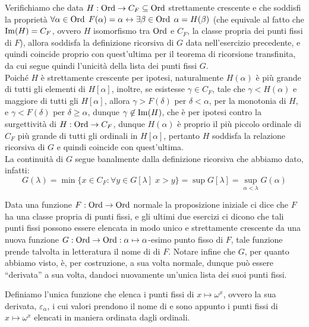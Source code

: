 \begin{soln}
	Verifichiamo che data $H : \operatorname{Ord} \to C_F \subseteq \operatorname{Ord}$ strettamente crescente e che soddisfi la proprietà $\forall \alpha \in \operatorname{Ord} \; F(\alpha) = \alpha \leftrightarrow \exists \beta \in \operatorname{Ord} \; \alpha = H(\beta)$ (che equivale al fatto che $\operatorname{Im}(H) = C_F$,
	ovvero $H$ isomorfismo tra $\operatorname{Ord}$ e $C_F$, la classe propria dei punti fissi di $F$), allora soddisfa la definizione ricorsiva di $G$ data nell'esercizio precedente,
	e quindi coincide proprio con quest'ultima per il teorema di ricorsione transfinita, da cui segue quindi l'unicità della lista dei punti fissi $G$.\\
	Poiché $H$ è strettamente crescente per ipotesi, naturalmente $H(\alpha)$ è più grande di tutti gli elementi di $H[\alpha]$, inoltre,
	se esistesse $\gamma \in C_F$, tale che $\gamma < H(\alpha)$ e maggiore di tutti gli $H[\alpha]$, allora $\gamma > F(\delta)$ per $\delta < \alpha$, per la monotonia di $H$, e $\gamma < F(\delta)$ per $\delta \geq \alpha$, dunque $\gamma \not\in \operatorname{Im}(H)$, che è per ipotesi contro la surgettività di $H : \operatorname{Ord} \to C_F$,
	dunque $H(\alpha)$ è proprio il più piccolo ordinale di $C_F$ più grande di tutti gli ordinali in $H[\alpha]$, pertanto $H$ soddisfa la relazione ricorsiva di $G$ e quindi coincide con quest'ultima.\\
	La continuità di $G$ segue banalmente dalla definizione ricorsiva che abbiamo dato, infatti:
	\[ G(\lambda) = \min\{x \in C_F : \forall y \in G[\lambda] \; x > y\} = \sup G[\lambda] = \sup_{\alpha < \lambda} G(\alpha)
		\]
\end{soln}

\begin{remark}
	Data una funzione $F : \operatorname{Ord} \to \operatorname{Ord}$ normale la proposizione iniziale ci dice che $F$ ha una classe propria di punti fissi, e gli ultimi due esercizi ci dicono che tali punti fissi possono essere elencata in modo unico e strettamente crescente da una nuova funzione $G : \operatorname{Ord} \to \operatorname{Ord} : \alpha \mapsto \alpha$-esimo punto fisso di $F$,
	tale funzione prende talvolta in letteratura il nome di  di $F$. Notare infine che $G$, per quanto abbiamo visto, è, per costruzione, a sua volta normale, dunque può essere ``derivata'' a sua volta, dandoci nuovamente un'unica lista dei suoi punti fissi.
\end{remark}

\begin{definition}
	Definiamo l'unica funzione che elenca i punti fissi di $x \mapsto \omega^x$, ovvero la sua derivata, $\varepsilon_\alpha$, i cui valori prendono il nome di  e sono appunto i punti fissi di $x \mapsto \omega^x$ elencati in maniera ordinata dagli ordinali.
\end{definition}

